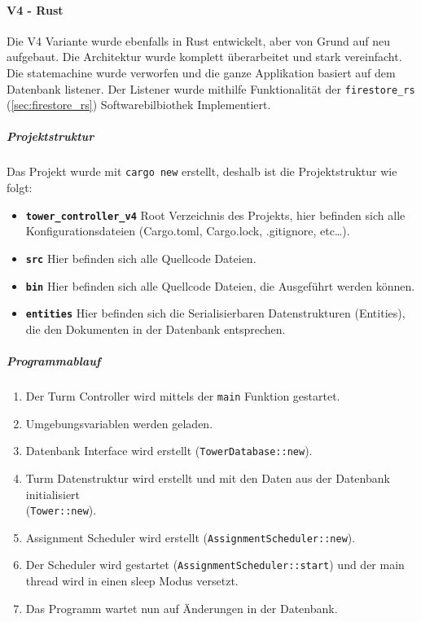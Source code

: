 \paragraph{V4 - Rust}

Die V4 Variante wurde ebenfalls in Rust entwickelt, aber von Grund auf neu aufgebaut. Die Architektur wurde komplett überarbeitet und stark vereinfacht. Die \Gls{statemachine} wurde verworfen und die ganze Applikation basiert auf dem Datenbank \Gls{listener}. Der Listener wurde mithilfe Funktionalität der \texttt{firestore\_rs} (\ref{sec:firestore_rs}) Softwarebilbiothek Implementiert.

\subparagraph{Projektstruktur}

Das Projekt wurde mit \texttt{cargo new} erstellt, deshalb ist die Projektstruktur wie folgt:


\begin{itemize}
  \item \textbf{\texttt{tower\_controller\_v4}} Root Verzeichnis des Projekts, hier befinden sich alle    Konfigurationsdateien (Cargo.toml, Cargo.lock, .gitignore, etc\ldots{}).
  \item \textbf{\texttt{src}} Hier befinden sich alle Quellcode Dateien.
  \item \textbf{\texttt{bin}} Hier befinden sich alle Quellcode Dateien, die Ausgeführt werden können.
  \item \textbf{\texttt{entities}} Hier befinden sich die Serialisierbaren Datenstrukturen (Entities), die den Dokumenten in der Datenbank entsprechen.
\end{itemize}

\subparagraph{Programmablauf}
\begin{enumerate}
  \item Der Turm Controller wird mittels der \texttt{main} Funktion gestartet.
  \item Umgebungsvariablen werden geladen.
  \item Datenbank Interface wird erstellt (\texttt{TowerDatabase::new}).
  \item Turm Datenstruktur wird erstellt und mit den Daten aus der Datenbank initialisiert\\(\texttt{Tower::new}).
  \item Assignment Scheduler wird erstellt (\texttt{AssignmentScheduler::new}).
  \item Der Scheduler wird gestartet (\texttt{AssignmentScheduler::start}) und der main \Gls{thread} wird in einen \Gls{sleep} Modus versetzt.
  \item Das Programm wartet nun auf Änderungen in der Datenbank.
\end{enumerate}

